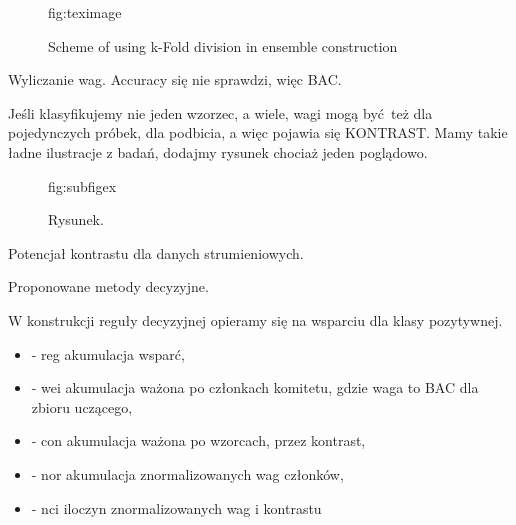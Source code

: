 \documentclass[pmlr]{jmlr}
\begin{document}
\begin{figure}[!h]
\floatconts
  {fig:teximage}
  {\caption{Scheme of using k-Fold division in ensemble construction}}
  {}
\end{figure}

Wyliczanie wag. Accuracy się nie sprawdzi, więc BAC.

Jeśli klasyfikujemy nie jeden wzorzec, a wiele, wagi mogą być też dla pojedynczych próbek, dla podbicia, a więc pojawia się KONTRAST. Mamy takie ładne ilustracje z badań, dodajmy rysunek chociaż jeden poglądowo.

\begin{figure}[!h]
\floatconts
  {fig:subfigex}
  {\caption{Rysunek.}}
  {%
  }
\end{figure}

Potencjał kontrastu dla danych strumieniowych.

Proponowane metody decyzyjne.

W konstrukcji reguły decyzyjnej opieramy się na wsparciu dla klasy pozytywnej.

\begin{itemize}
	\item - reg akumulacja wsparć,
	\item - wei akumulacja ważona po członkach komitetu, gdzie waga to BAC dla zbioru uczącego,
	\item - con akumulacja ważona po wzorcach, przez kontrast,
	\item - nor akumulacja znormalizowanych wag członków,
	\item - nci iloczyn znormalizowanych wag i kontrastu
\end{itemize}
\end{document}
